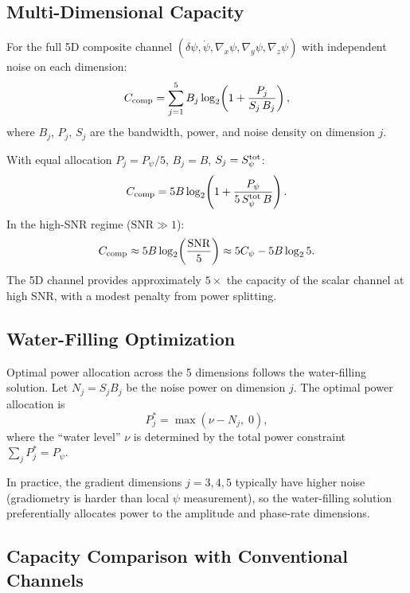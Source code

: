 \documentclass[twocolumn,superscriptaddress,prd,nofootinbib]{revtex4-2}
\newcommand{\SNR}{\mathrm{SNR}}
\begin{document}
\subsection{Multi-Dimensional Capacity}

For the full 5D composite channel $(\delta\psi, \dot\psi,
\nabla_x\psi, \nabla_y\psi, \nabla_z\psi)$ with independent noise on
each dimension:
\begin{equation}
C_{\rm comp} = \sum_{j=1}^{5} B_j\log_2\!\left(1 +
\frac{P_j}{S_j\,B_j}\right),
\label{eq:capacity-5D}
\end{equation}
where $B_j$, $P_j$, $S_j$ are the bandwidth, power, and noise density
on dimension $j$.

With equal allocation $P_j = P_\psi/5$, $B_j = B$, $S_j = S_\psi^{\rm tot}$:
\begin{equation}
C_{\rm comp} = 5B\log_2\!\left(1 + \frac{P_\psi}{5\,S_\psi^{\rm tot}\,B}\right).
\label{eq:capacity-equal}
\end{equation}
In the high-SNR regime ($\SNR \gg 1$):
\begin{equation}
C_{\rm comp} \approx 5B\log_2\!\left(\frac{\SNR}{5}\right)
\approx 5C_\psi - 5B\log_2 5.
\label{eq:capacity-highSNR}
\end{equation}
The 5D channel provides approximately $5\times$ the capacity of the
scalar channel at high SNR, with a modest penalty from power splitting.

\subsection{Water-Filling Optimization}

Optimal power allocation across the 5 dimensions follows the
water-filling solution.
Let $N_j = S_j B_j$ be the noise power on dimension $j$.
The optimal power allocation is
\begin{equation}
P_j^* = \max\!\left(\nu - N_j,\;0\right),
\label{eq:waterfilling}
\end{equation}
where the ``water level'' $\nu$ is determined by the total power constraint
$\sum_j P_j^* = P_\psi$.

In practice, the gradient dimensions $j = 3,4,5$ typically have higher
noise (gradiometry is harder than local $\psi$ measurement), so the
water-filling solution preferentially allocates power to the amplitude
and phase-rate dimensions.

\subsection{Capacity Comparison with Conventional Channels}
\end{document}
